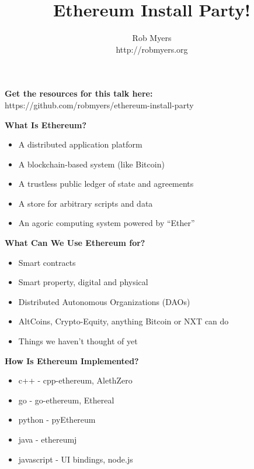 \documentclass{beamer}
\title{Ethereum Install Party!}
\author{Rob Myers\\http://robmyers.org}
\begin{document}
\maketitle{}

\begin{frame}
\textbf{Get the resources for this talk here:}
\newline{}
https://github.com/robmyers/ethereum-install-party
\end{frame}


\begin{frame}
\textbf{What Is Ethereum?}
\begin{itemize}
  \item{A distributed application platform}
  \item{A blockchain-based system (like Bitcoin)}
  \item{A trustless public ledger of state and agreements}
  \item{A store for arbitrary scripts and data}
  \item{An agoric computing system powered by ``Ether''}
\end{itemize}
\end{frame}


\begin{frame}
\textbf{What Can We Use Ethereum for?}
\begin{itemize}
  \item{Smart contracts}
  \item{Smart property, digital and physical}
  \item{Distributed Autonomous Organizations (DAOs)}
  \item{AltCoins, Crypto-Equity, anything Bitcoin or NXT can do}
  \item{Things we haven't thought of yet}
\end{itemize}
\end{frame}


\begin{frame}
\textbf{How Is Ethereum Implemented?}
\begin{itemize}
  \item{c++ - cpp-ethereum, AlethZero}
  \item{go - go-ethereum, Ethereal}
  \item{python - pyEthereum}
  \item{java - ethereumj}
  \item{javascript - UI bindings, node.js}
\end{itemize}
\end{frame}
\end{document}
